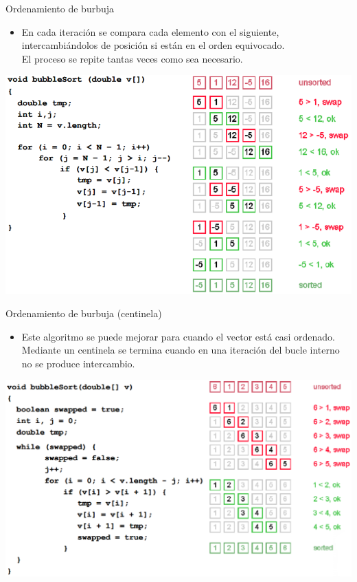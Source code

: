 \documentclass{beamer} %
\begin{document}
\begin{frame}{Ordenamiento de burbuja}
    \begin{itemize}
        \item {\footnotesize En cada iteración se compara cada elemento con el siguiente, intercambiándolos de posición si están en el orden equivocado.\\
        El proceso se repite tantas veces como sea necesario.}
    \end{itemize}
    \begin{center}
        \includegraphics[width=.8\textwidth]{./image/cap5/bubble-sort.png}
    \end{center}
\end{frame}

\begin{frame}{Ordenamiento de burbuja (centinela)}
    \begin{itemize}
        \item {\footnotesize Este algoritmo se puede mejorar para cuando el vector está casi ordenado. Mediante un centinela se termina cuando en una iteración del bucle interno no se produce intercambio.}
    \end{itemize}
    \begin{center}
        \includegraphics[width=.9\textwidth]{./image/cap5/bubble-sort2.png}
    \end{center}
\end{frame}
\end{document}
